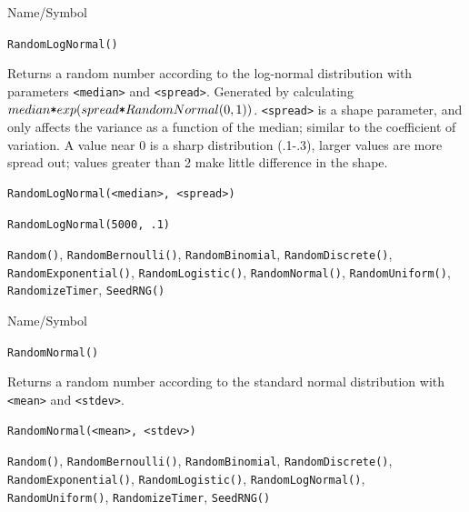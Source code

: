\begin{desc}{Name/Symbol}
\item[Name/Symbol] 	\verb+RandomLogNormal()+

\item[Description]  	Returns a random number according to the log-normal 
		distribution with parameters \verb+<median>+ and \verb+<spread>+. Generated 
		by calculating $median \verb!*! exp(spread \verb!*! RandomNormal(0,1))$. 
		\verb+<spread>+ is a shape parameter, and only affects the variance 
		as a function of the median; similar to the coefficient of 
		variation.  A value near 0 is a sharp distribution (.1-.3), 
		larger values are more spread out; values greater than 2 make 
		little difference in the shape.

\item[Usage]
\begin{verbatim}
RandomLogNormal(<median>, <spread>)
\end{verbatim}

\item[Example]      	
\begin{verbatim}
RandomLogNormal(5000, .1)
\end{verbatim}

\item[See Also]	\verb+Random()+, \verb+RandomBernoulli()+, \verb+RandomBinomial+, 
		\verb+RandomDiscrete()+, \verb+RandomExponential()+, \verb+RandomLogistic()+,
		\verb+RandomNormal()+, \verb+RandomUniform()+, \verb+RandomizeTimer+, \verb+SeedRNG()+
\end{desc}

\begin{desc}{Name/Symbol}
\item[Name/Symbol] 	\verb+RandomNormal()+

\item[Description] 	Returns a random number according to the standard
             	normal distribution with \verb+<mean>+ and \verb+<stdev>+.

\item[Usage]       	
\begin{verbatim}
RandomNormal(<mean>, <stdev>)
\end{verbatim}

\item[Example]	

\item[See Also]	\verb+Random()+, \verb+RandomBernoulli()+, \verb+RandomBinomial+,
		\verb+RandomDiscrete()+, \verb+RandomExponential()+, \verb+RandomLogistic()+, 
		\verb+RandomLogNormal()+, \verb+RandomUniform()+, \verb+RandomizeTimer+, \verb+SeedRNG()+
\end{desc}

